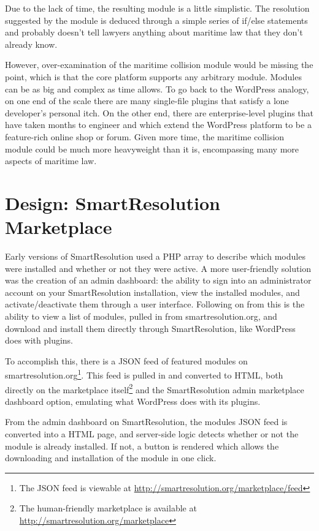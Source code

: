 Due to the lack of time, the resulting module is a little simplistic. The resolution suggested by the module is deduced through a simple series of if/else statements and probably doesn't tell lawyers anything about maritime law that they don't already know.

However, over-examination of the maritime collision module would be missing the point, which is that the core platform supports any arbitrary module. Modules can be as big and complex as time allows. To go back to the WordPress analogy, on one end of the scale there are many single-file plugins that satisfy a lone developer's personal itch. On the other end, there are enterprise-level plugins that have taken months to engineer and which extend the WordPress platform to be a feature-rich online shop or forum. Given more time, the maritime collision module could be much more heavyweight than it is, encompassing many more aspects of maritime law.

\section{Design: SmartResolution Marketplace}

Early versions of SmartResolution used a PHP array to describe which modules were installed and whether or not they were active. A more user-friendly solution was the creation of an admin dashboard: the ability to sign into an administrator account on your SmartResolution installation, view the installed modules, and activate/deactivate them through a user interface. Following on from this is the ability to view a list of modules, pulled in from smartresolution.org, and download and install them directly through SmartResolution, like WordPress does with plugins.

To accomplish this, there is a JSON feed of featured modules on smartresolution.org\footnote{The JSON feed is viewable at \url{http://smartresolution.org/marketplace/feed}}. This feed is pulled in and converted to HTML, both directly on the marketplace itself\footnote{The human-friendly marketplace is available at \url{http://smartresolution.org/marketplace}} and the SmartResolution admin marketplace dashboard option, emulating what WordPress does with its plugins.

From the admin dashboard on SmartResolution, the modules JSON feed is converted into a HTML page, and server-side logic detects whether or not the module is already installed. If not, a button is rendered which allows the downloading and installation of the module in one click.

